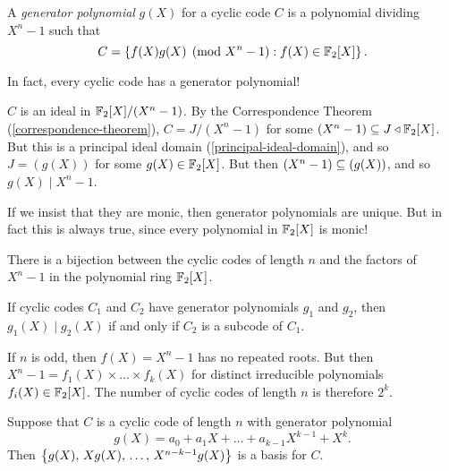 \documentclass{article}
\begin{document}
\begin{definition}
    A \textit{generator polynomial} $g(X)$ for a cyclic code $C$ is a polynomial dividing $X^n - 1$ such that
    \[
	C = \left\lbrace f(X)g(X) \pmod{X^n - 1} : f(X) \in \mathbb{F}_2[X] \right\rbrace.
	\]
\end{definition}

\begin{theorem}
    In fact, every cyclic code has a generator polynomial!
\end{theorem}

\begin{prf}
    $C$ is an ideal in $\mathbb{F}_2[X] / (X^n - 1)$. By the Correspondence Theorem (\ref{correspondence-theorem}), $C = J/(X^n-1)$ for some $(X^n-1) \subseteq J \triangleleft \mathbb{F}_2[X]$. But this is a principal ideal domain (\ref{principal-ideal-domain}), and so $J = (g(X))$ for some $g(X) \in \mathbb{F}_2[X]$. But then $(X^n - 1) \subseteq (g(X))$, and so $g(X) \mid X^n - 1$.
\end{prf}

\begin{corollary}
    If we insist that they are monic, then generator polynomials are unique. But in fact this is always true, since every polynomial in $\mathbb{F}_2[X]$ is monic!
\end{corollary}

\begin{corollary}
    There is a bijection between the cyclic codes of length $n$ and the factors of $X^n-1$ in the polynomial ring $\mathbb{F}_2[X]$.
\end{corollary}

\begin{corollary}
    If cyclic codes $C_1$ and $C_2$ have generator polynomials $g_1$ and $g_2$, then $g_1(X) \mid g_2(X)$ if and only if $C_2$ is a subcode of $C_1$.
\end{corollary}

\begin{corollary}
    If $n$ is odd, then $f(X) = X^n - 1$ has no repeated roots. But then $X^n - 1 = f_1(X) \times \dots \times f_k(X)$ for distinct irreducible polynomials $f_i(X) \in \mathbb{F}_2[X]$. The number of cyclic codes of length $n$ is therefore $2^k$.
\end{corollary}

\begin{proposition}
    Suppose that $C$ is a cyclic code of length $n$ with generator polynomial
    \[
	g(X) = a_0 + a_1X + \dots + a_{k-1} X^{k-1} + X^k.
	\]
	Then $\left\lbrace g(X), \, Xg(X), \, \dots, \, X^{n-k-1}g(X) \right\rbrace$ is a basis for $C$.
\end{proposition}
\end{document}
